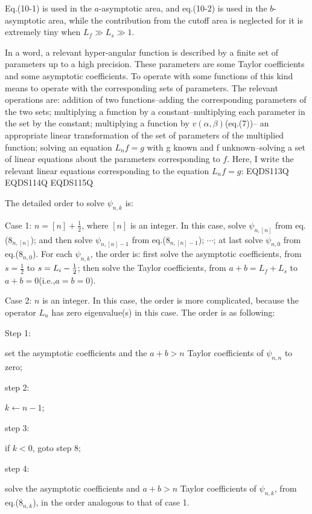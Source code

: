 Eq.(10-1) is used in the $a$-asymptotic area, and eq.(10-2) is used in the
$b$-asymptotic area, while the contribution from the cutoff area is neglected for
it is extremely tiny when $L_f\gg L_s\gg 1$.

In a word, a relevant hyper-angular function is described by a finite set of
parameters up to a high precision. These parameters are some Taylor
coefficients and some asymptotic coefficients.
To operate with some functions of this kind means
to operate with the corresponding sets of parameters. The relevant operations
are: addition of two functions--adding the corresponding parameters of the
two sets; multiplying a function by a constant--multiplying each parameter in the
set by the constant; multiplying a function by $v(\alpha,\beta)$(eq.(7))--
an appropriate linear transformation of the set of parameters of the multiplied
function; solving an equation $L_{n}f=g$ with g known and f unknown--solving
a set of linear equations about the parameters corresponding to $f$. Here, I write
the relevant linear equations corresponding to the equation $L_{n}f=g$:
 EQDS113Q 
 EQDS114Q 
 EQDS115Q 

The detailed order to solve $\psi_{n,k}$ is:

Case 1: $n=[n]+\frac{1}{2}$, where $[n]$ is an integer. In this case,
solve $\psi_{n,[n]}$ from eq.($8_{n,[n]}$);
and then solve $\psi_{n,[n]-1}$ from eq.($8_{n,[n]-1}$);
$\cdots$; at last solve $\psi_{n,0}$ from eq.($8_{n,0}$). For each
$\psi_{n,k}$, the order is: first solve the asymptotic coefficients,
from $s=\frac{1}{2}$ to $s=L_{i}-{1 \over 2}$; then solve the
Taylor coefficients, from $a+b=L_{f}+L_{s}$ to $a+b=0$(i.e.,$a=b=0$).

Case 2: $n$ is an integer. In this case, the order is more complicated,
because the operator $L_{n}$ has zero eigenvalue(s) in this case. The order
is as following:

\vspace{0.5mm}
\noindent Step 1: \parbox[t]{146mm}
{set the asymptotic coefficients and the $a+b>n$ Taylor coefficients
of $\psi_{n,n}$ to zero;}

\vspace{1.5mm}
\noindent step 2: \parbox[t]{146mm}
{$k\gets n-1$;}

\vspace{1.5mm}
\noindent step 3: \parbox[t]{146mm}
{if $k<0$, goto step 8;}

\vspace{1.5mm}
\noindent step 4: \parbox[t]{146mm}
{solve the asymptotic coefficients and $a+b>n$ Taylor coefficients of
$\psi_{n,k}$, from eq.($8_{n,k}$), in the order analogous to that of case 1.}

